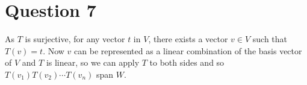 \section*{Question 7}
As $ T $ is surjective, for any vector $ t $ in $ V $, there exists a vector $ v \in V $ such that $ T(v) = t $. Now $ v $ can be represented as a linear combination of the basis vector of $ V $ and $ T $ is linear, so we can apply $ T $ to both sides and so $ T(v_1) T(v_2) \cdots T(v_n) $ span $ W $.